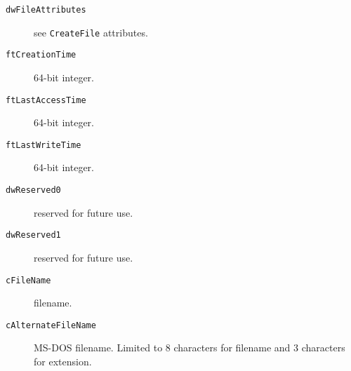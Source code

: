 \begin{description}
\item [\texttt{dwFileAttributes}] see \texttt{CreateFile} attributes.
\item [\texttt{ftCreationTime}] 64-bit integer.
\item [\texttt{ftLastAccessTime}] 64-bit integer.
\item [\texttt{ftLastWriteTime}] 64-bit integer.
\item [\texttt{dwReserved0}] reserved for future use.
\item [\texttt{dwReserved1}] reserved for future use.
\item [\texttt{cFileName}] filename.
\item [\texttt{cAlternateFileName}] MS-DOS filename. Limited to 8 characters for filename and 3 characters for extension.
\end{description}